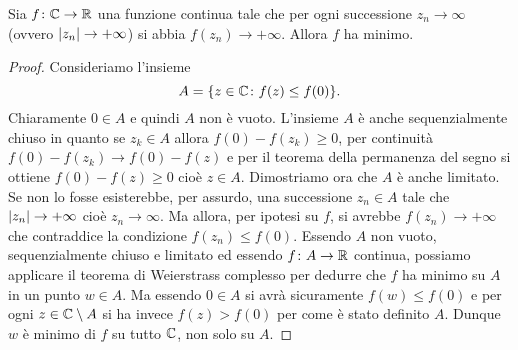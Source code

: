 \begin{theorem}
Sia $f\colon \mathbb C \to \mathbb R$ una funzione continua tale che per ogni
successione $z_n \to \infty$ (ovvero ${\left|z_n\right|}\to +\infty$)
si abbia $f(z_n) \to +\infty$.
Allora $f$ ha minimo.
\end{theorem}
%
\begin{proof}
Consideriamo l'insieme
\[
  A = \{z \in \mathbb C \colon f(z) \le f(0)\}.
\]
Chiaramente $0\in A$ e quindi $A$ non è vuoto.
L'insieme $A$ è anche sequenzialmente chiuso in quanto se $z_k\in A$ allora $f(0) - f(z_k)\ge 0$,
per continuità $f(0)-f(z_k)\to f(0)-f(z)$
e per il teorema della permanenza del segno si ottiene $f(0)-f(z) \ge 0$ cioè $z \in A$.
Dimostriamo ora che $A$ è anche limitato. Se non lo fosse esisterebbe, per assurdo, una successione $z_n \in A$ tale che ${\left|z_n\right|}\to +\infty$ cioè $z_n \to \infty$. Ma allora, per ipotesi su $f$, si avrebbe $f(z_n)\to +\infty$ che contraddice la condizione $f(z_n) \le f(0)$. Essendo $A$ non vuoto, sequenzialmente chiuso e limitato ed essendo $f\colon A \to \mathbb R$ continua, possiamo applicare il teorema di Weierstrass complesso per dedurre che $f$ ha minimo su $A$ in un punto $w \in A$. Ma essendo $0\in A$ si avrà sicuramente $f(w)\le f(0)$ e per ogni $z\in \mathbb C \setminus A$ si ha invece $f(z) > f(0)$ per come è stato definito $A$. Dunque $w$ è minimo di $f$ su tutto $\mathbb C$, non solo su $A$.
\end{proof}

